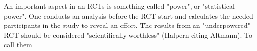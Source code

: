 \documentclass[12p]{article}
\begin{document}




An important aspect in an RCTs is something called "power", or "statistical power".
One conducts an analysis before the RCT start and calculates the needed participants in the study to reveal an effect.
The results from an "underpowered" RCT should be considered "scientifically worthless" (Halpern citing Altmann). 
To call them 
 

\end{document}
